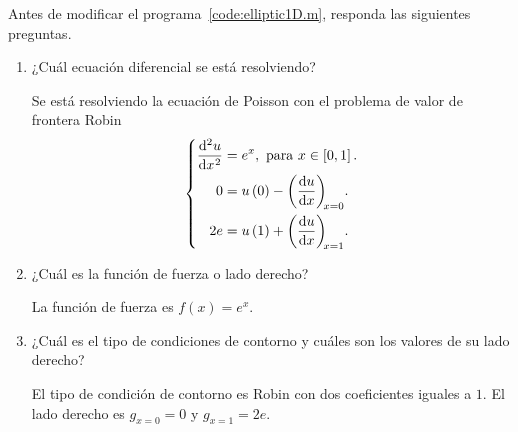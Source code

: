 \begin{problem}

Antes de modificar el programa~\ref{code:elliptic1D.m}, responda las
siguientes preguntas.

\begin{enumerate}
    \item

          ¿Cuál ecuación diferencial se está resolviendo?

          \begin{solution}
              Se está resolviendo la ecuación de Poisson con el
              problema de valor de frontera
              Robin~\cite{CORBINO2020112326}
              \begin{equation}\label{eq:poisson1drobindconditions}
                  \left\{
                  \begin{aligned}
                      \diff[2]{u}{x}
                       & =e^{x},
                      \text{ para }x\in\left[0,1\right].     \\
                      0
                       & = u\left(0\right)-\diff{u}{x}[x=0]. \\
                      2e
                       & =u\left(1\right)+\diff{u}{x}[x=1].  \\
                  \end{aligned}
                  \right.
              \end{equation}
              \noQED
          \end{solution}

    \item

          ¿Cuál es la función de fuerza o lado derecho?

          \begin{solution}
              La función de fuerza es
              \begin{math}
                  f\left(x\right)=
                  e^{x}
              \end{math}.
              \noQED
          \end{solution}

    \item

          ¿Cuál es el tipo de condiciones de contorno y cuáles son
          los valores de su lado derecho?

          \begin{solution}
              El tipo de condición de contorno es Robin con dos
              coeficientes iguales a $1$.
              El lado derecho es $g_{x=0}=0$ y $g_{x=1}=2e$.
              \noQED
          \end{solution}


\end{enumerate}
\end{problem}
